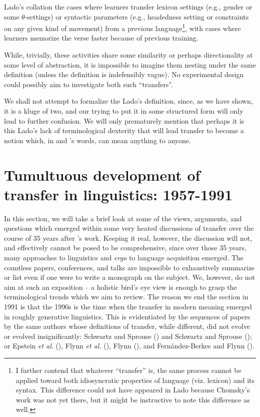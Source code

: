 \documentclass{article}
\begin{document}
\pex Lado's collation 
\a the cases where learners transfer lexicon settings (e.g., gender or some \(\theta\)-settings) or syntactic parameters (e.g., headedness setting or constraints on any given kind of movement) from a previous language\footnote{I further contend that whatever ``transfer'' is, the same process cannot be applied toward both idiosyncratic properties of language (viz. lexicon) and its syntax. This difference could not have appeared in Lado because Chomsky's work was not yet there, but it might be instructive to note this difference as well.}, with 
\a cases where learners memorize the verse faster because of previous training.
\xe 

While, trivially, these activities share some similarity or perhaps directionality at some level of abstraction, it is impossible to imagine them nesting under the same definition (unless the definition is indefensibly vague). No experimental design could possibly aim to investigate both such ``transfers''.  

We shall not attempt to formalize the Lado’s definition, since, as we have shown, it is a kluge of two, and our trying to put it in some structured form will only lead to further confusion. We will only prematurely mention that perhaps it is this Lado’s lack of terminological dexterity that will lead transfer to become a notion which, in \cite{wenk_interference_1974} and \cite{kellerman_towards_1977}’s words, can mean anything to anyone.         

\section{Tumultuous development of transfer in linguistics: 1957-1991}

In this section, we will take a brief look at some of the views, arguments, and questions which emerged within some very heated discussions of transfer over the course of 35 years after \cite{lado_linguistics_1957}’s work. Keeping it real, however, the discussion will not, and effectively cannot be posed to be comprehensive, since over those 35 years, many approaches to linguistics and \textit{ergo} to language acquisition emerged. The countless papers, conferences, and talks are impossible to exhaustively summarize or list even if one were to write a monograph on the subject. We, however, do not aim at such an exposition -- a holistic bird’s eye view is enough to grasp the terminological trends which we aim to review. The reason we end the section in 1991 is that the 1990s is the time when the transfer in modern meaning emerged in roughly generative linguistics. This is evidentiated by the sequences of papers by the same authors whose definitions of transfer, while different, did not evolve or evolved insignificantly: Schwartz and Sprouse (\citeyear{schwartz_l2_1996}) and Schwartz and Sprouse (\citeyear{schwartz_full_2021}); or Epstein \textit{et al}. (\citeyear{epstein_second_1996}), Flynn \textit{et al.} (\citeyear{flynn_cumulative-enhancement_2004}), Flynn (\citeyear{flynn_microvariation_2021}), and Fernández-Berkes and Flynn (\citeyear{fernandez-berkes_vindicating_2021}).
\end{document}
